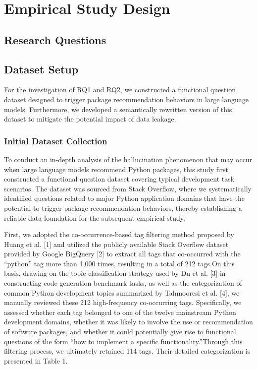 \section{Empirical Study Design}

\subsection{Research Questions}


 
\subsection{Dataset Setup }
For the investigation of RQ1 and RQ2, we constructed a functional question dataset designed to trigger package recommendation behaviors in large language models. 
Furthermore, we developed a semantically rewritten version of this dataset to mitigate the potential impact of data leakage.

\subsubsection{Initial Dataset Collection}
To conduct an in-depth analysis of the hallucination phenomenon that may occur when large language models recommend Python packages, this study first constructed 
a functional question dataset covering typical development task scenarios. The dataset was sourced from Stack Overflow, where we systematically identified questions 
related to major Python application domains that have the potential to trigger package recommendation behaviors, thereby establishing a reliable data foundation for 
the subsequent empirical study.

First, we adopted the co-occurrence-based tag filtering method proposed by Huang et al. [1] and utilized the publicly available Stack Overflow dataset provided by 
Google BigQuery [2] to extract all tags that co-occurred with the “python” tag more than 1,000 times, resulting in a total of 212 tags.On this basis, drawing on the 
topic classification strategy used by Du et al. [3] in constructing code generation benchmark tasks, as well as the categorization of common Python development topics 
summarized by Tahmooresi et al. [4], we manually reviewed these 212 high-frequency co-occurring tags. Specifically, we assessed whether each tag belonged to one of 
the twelve mainstream Python development domains, whether it was likely to involve the use or recommendation of software packages, and whether it could potentially 
give rise to functional questions of the form “how to implement a specific functionality.”Through this filtering process, we ultimately retained 114 tags. Their 
detailed categorization is presented in Table 1.

